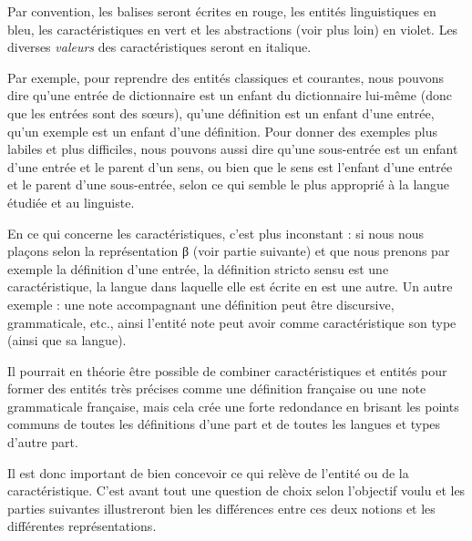 \documentclass[10pt]{report}
\newcommand{\balise}[1]{\textcolor{red!80}{#1}}
\newcommand{\entité}[1]{\textcolor{blue!80!black}{#1}}
\newcommand{\caractéristique}[1]{\textcolor{green!60!black}{#1}}
\newcommand{\abstraction}[1]{\textcolor{blue!50!red}{#1}}
\begin{document}
Par convention, les \balise{balises} seront écrites en rouge, les \entité{entités linguistiques} en bleu, les \caractéristique{caractéristiques} en vert et les \abstraction{abstractions} (voir plus loin) en violet. Les diverses \textit{valeurs} des caractéristiques seront en italique.

\bigskip

Par exemple, pour reprendre des entités classiques et courantes, nous pouvons dire qu’une \entité{entrée} de dictionnaire est un enfant du \entité{dictionnaire} lui-même (donc que les \entité{entrées} sont des sœurs), qu’une \entité{définition} est un enfant d’une \entité{entrée}, qu’un \entité{exemple} est un enfant d’une \entité{définition}. Pour donner des exemples plus labiles et plus difficiles, nous pouvons aussi dire qu’une \entité{sous-entrée} est un enfant d’une \entité{entrée} et le parent d’un \entité{sens}, ou bien que le \entité{sens} est l’enfant d’une \entité{entrée} et le parent d’une \entité{sous-entrée}, selon ce qui semble le plus approprié à la langue étudiée et au linguiste.

En ce qui concerne les caractéristiques, c’est plus inconstant : si nous nous plaçons selon la représentation β (voir partie suivante) et que nous prenons par exemple la \entité{définition} d’une \entité{entrée}, la \caractéristique{définition} stricto sensu est une caractéristique, la \caractéristique{langue} dans laquelle elle est écrite en est une autre. Un autre exemple : une \entité{note} accompagnant une \entité{définition} peut être discursive, grammaticale, etc., ainsi l’entité \entité{note} peut avoir comme caractéristique son \caractéristique{type} (ainsi que sa \caractéristique{langue}).

\bigskip

Il pourrait en théorie être possible de combiner caractéristiques et entités pour former des entités très précises comme une \entité{définition française} ou une \entité{note grammaticale française}, mais cela crée une forte redondance en brisant les points communs de toutes les \entité{définitions} d’une part et de toutes les \caractéristique{langues} et \caractéristique{types} d’autre part.

\bigskip

Il est donc important de bien concevoir ce qui relève de l’entité ou de la caractéristique. C’est avant tout une question de choix selon l’objectif voulu et les parties suivantes illustreront bien les différences entre ces deux notions et les différentes représentations.
\end{document}
